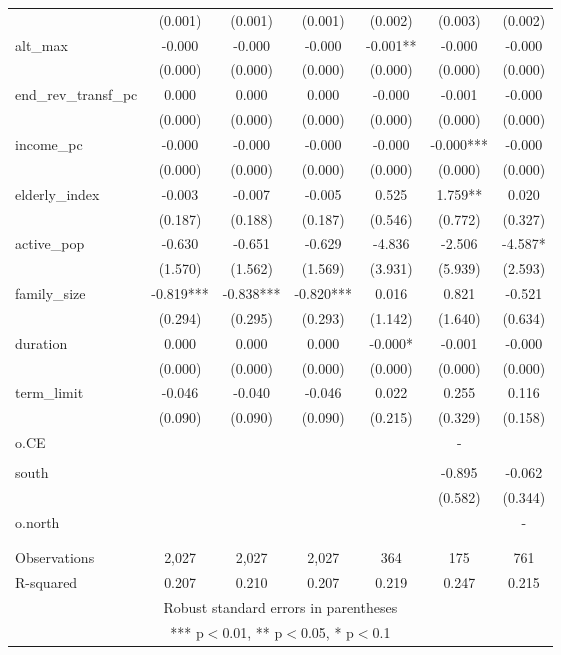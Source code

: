 \documentclass[]{article}
\begin{document}
\begin{tabular}{lcccccc}
 & (0.001) & (0.001) & (0.001) & (0.002) & (0.003) & (0.002) \\
alt\_max & -0.000 & -0.000 & -0.000 & -0.001** & -0.000 & -0.000 \\
 & (0.000) & (0.000) & (0.000) & (0.000) & (0.000) & (0.000) \\
end\_rev\_transf\_pc & 0.000 & 0.000 & 0.000 & -0.000 & -0.001 & -0.000 \\
 & (0.000) & (0.000) & (0.000) & (0.000) & (0.000) & (0.000) \\
income\_pc & -0.000 & -0.000 & -0.000 & -0.000 & -0.000*** & -0.000 \\
 & (0.000) & (0.000) & (0.000) & (0.000) & (0.000) & (0.000) \\
elderly\_index & -0.003 & -0.007 & -0.005 & 0.525 & 1.759** & 0.020 \\
 & (0.187) & (0.188) & (0.187) & (0.546) & (0.772) & (0.327) \\
active\_pop & -0.630 & -0.651 & -0.629 & -4.836 & -2.506 & -4.587* \\
 & (1.570) & (1.562) & (1.569) & (3.931) & (5.939) & (2.593) \\
family\_size & -0.819*** & -0.838*** & -0.820*** & 0.016 & 0.821 & -0.521 \\
 & (0.294) & (0.295) & (0.293) & (1.142) & (1.640) & (0.634) \\
duration & 0.000 & 0.000 & 0.000 & -0.000* & -0.001 & -0.000 \\
 & (0.000) & (0.000) & (0.000) & (0.000) & (0.000) & (0.000) \\
term\_limit & -0.046 & -0.040 & -0.046 & 0.022 & 0.255 & 0.116 \\
 & (0.090) & (0.090) & (0.090) & (0.215) & (0.329) & (0.158) \\
o.CE &  &  &  &  & - &  \\
 &  &  &  &  &  &  \\
south &  &  &  &  & -0.895 & -0.062 \\
 &  &  &  &  & (0.582) & (0.344) \\
o.north &  &  &  &  &  & - \\
 &  &  &  &  &  &  \\
 &  &  &  &  &  &  \\
Observations & 2,027 & 2,027 & 2,027 & 364 & 175 & 761 \\
 R-squared & 0.207 & 0.210 & 0.207 & 0.219 & 0.247 & 0.215 \\ \hline
\multicolumn{7}{c}{ Robust standard errors in parentheses} \\
\multicolumn{7}{c}{ *** p$<$0.01, ** p$<$0.05, * p$<$0.1} \\
\end{tabular}
\end{document}
